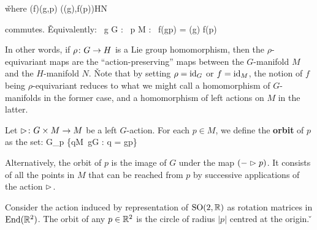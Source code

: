 \bse
{}
\ese

\v

where
\bse
(\rho\times f)(g,p) \coloneqq (\rho(g),f(p))\in H\times N
\ese

commutes. \v

Equivalently:
\bse
\forall \, g \in G : \forall \, p \in M : \ f(g\lacts p) = \rho(g) \blacktriangleright f(p)
\ese
\ed

In other words, if $\rho\colon G \to H$ is a Lie group homomorphism, then the $\rho$-equivariant maps are the 
``action-preserving'' maps between the $G$-manifold $M$ and the $H$-manifold $N$. \v

Note that by setting $\rho = \operatorname{id}_G$ or $f=\operatorname{id}_M$, the notion of $f$ being $\rho$-equivariant reduces to what we might
call a homomorphism of $G$-manifolds in the former case, and a homomorphism of left actions on $M$ in the latter.

\bd[Orbit]
Let $\vartriangleright \colon G \times M \to M$ be a left $G$-action. For each $p\in M$, we define the \textbf{orbit} 
of $p$ as the set:
\bse
G_p \coloneqq \{q\in M\mid \exists \, g\in G : q = g\lacts p\}
\ese
\ed

Alternatively, the orbit of $p$ is the image of $G$ under the map $( {}-\vartriangleright p)$. It consists of all the points in 
$M$ that can be reached from $p$ by successive applications of the action $\vartriangleright$.

\be
Consider the action induced by representation of $\operatorname{SO}(2,\mathbb{R})$ as rotation matrices in $\operatorname{End}(\mathbb{R}^2)$. The orbit of any 
$p\in\mathbb{R}^2$ is the circle of radius $|p|$ centred at the origin. \v

\begin{center}
\end{center}
\ee

